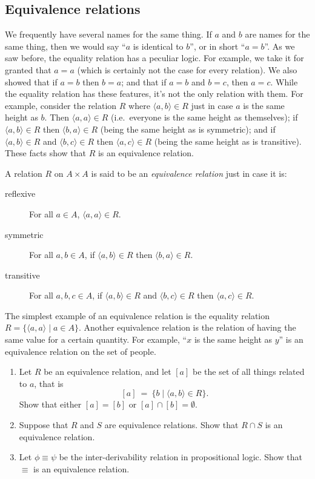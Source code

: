 \subsection{Equivalence relations}

We frequently have several names for the same thing.  If $a$ and $b$
are names for the same thing, then we would say ``$a$ is identical to
$b$'', or in short ``$a=b$''.  As we saw before, the equality relation
has a peculiar logic.  For example, we take it for granted that $a=a$
(which is certainly not the case for every relation).  We also showed
that if $a=b$ then $b=a$; and that if $a=b$ and $b=c$, then $a=c$.
While the equality relation has these features, it's not the only
relation with them.  For example, consider the relation $R$ where
$\langle a,b\rangle\in R$ just in case $a$ is the same height as $b$.
Then $\langle a,a\rangle \in R$ (i.e.\ everyone is the same height as
themselves); if $\langle a,b\rangle\in R$ then
$\langle b,a\rangle\in R$ (being the same height as is symmetric); and
if $\langle a,b\rangle\in R$ and $\langle b,c\rangle\in R$ then
$\langle a,c\rangle\in R$ (being the same height as is
transitive). These facts show that $R$ is an equivalence relation.

A relation $R$ on $A\times A$ is said to be an \emph{equivalence
  relation} just in case it is:
\begin{description}
\item[reflexive] For all $a\in A$, $\langle a,a\rangle\in R$.
\item[symmetric] For all $a,b\in A$, if $\langle a,b\rangle\in R$ then
  $\langle b,a\rangle\in R$.
\item[transitive] For all $a,b,c\in A$, if $\langle a,b\rangle\in R$
  and $\langle b,c\rangle\in R$ then $\langle a,c\rangle\in R$.
\end{description}
The simplest example of an equivalence relation is the equality
relation $R=\{ \langle a,a\rangle \mid a\in A\}$. Another equivalence
relation is the relation of having the same value for a certain
quantity.  For example, ``$x$ is the same height as $y$'' is an
equivalence relation on the set of people.

\begin{exercises} \mbox{} \begin{enumerate} \item Let $R$ be an equivalence relation, and let $[a]$ be
  the set of all things related to $a$, that is
  \[ [a] \: = \: \{ b \mid \langle a,b\rangle\in R\} . \]
  Show that either $[a]=[b]$ or $[a]\cap [b]=\emptyset$.
\item Suppose that $R$ and $S$ are equivalence relations.  Show that
  $R\cap S$ is an equivalence relation.
\item Let $\phi\equiv\psi$ be the inter-derivability relation in
  propositional logic.  Show that $\equiv$ is an equivalence
  relation. \end{enumerate} \end{exercises}



